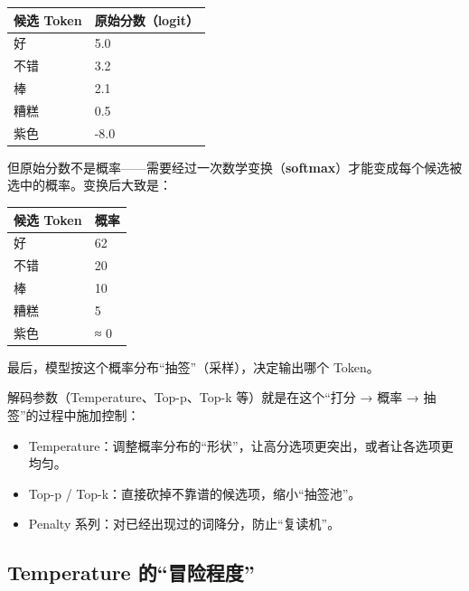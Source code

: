 \documentclass[9pt,a4paper,twocolumn]{ctexart}
\begin{document}
{\footnotesize
\begin{tabular}{|p{}|p{}|}
\hline
\textbf{候选 Token} & \textbf{原始分数（logit）} \\
\hline
好 & 5.0 \\
\hline
不错 & 3.2 \\
\hline
棒 & 2.1 \\
\hline
糟糕 & 0.5 \\
\hline
紫色 & -8.0 \\
\hline
\end{tabular}
}



但原始分数不是概率——需要经过一次数学变换（\textbf{softmax}）才能变成每个候选被选中的概率。变换后大致是：


{\footnotesize
\begin{tabular}{|p{}|p{}|}
\hline
\textbf{候选 Token} & \textbf{概率} \\
\hline
好 & 62\\%
\hline
不错 & 20\\%
\hline
棒 & 10\\%
\hline
糟糕 & 5\\%
\hline
紫色 & ≈ 0\\%
\hline
\end{tabular}
}



最后，模型按这个概率分布“抽签”（采样），决定输出哪个 Token。



解码参数（Temperature、Top-p、Top-k 等）就是在这个“打分 → 概率 → 抽签”的过程中施加控制：


\begin{itemize}[itemsep=1pt, topsep=2pt]
  \item Temperature：调整概率分布的“形状”，让高分选项更突出，或者让各选项更均匀。
  \item Top-p / Top-k：直接砍掉不靠谱的候选项，缩小“抽签池”。
  \item Penalty 系列：对已经出现过的词降分，防止“复读机”。
\end{itemize}


\subsection*{Temperature 的“冒险程度”}
\end{document}
